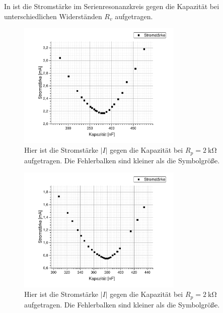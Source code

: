 \documentclass[
	a4paper,
	12pt,
	pagesize,
	ngerman
]{scrartcl}
\begin{document}
	In  ist die Stromstärke im Serienresonanzkreis gegen die Kapazität bei unterschiedlichen Widerständen $ R_v $ aufgetragen.
	\begin{figure}[H]
		\includegraphics[width=0.7\textwidth]{Parallelstromkreis_2k}
		\centering
		\caption{Hier ist die Stromstärke $ \left| I \right| $ gegen die Kapazität bei $ R_p = \SI{2}{\kilo \ohm} $ aufgetragen. Die Fehlerbalken sind kleiner als die Symbolgröße.}
		\label{Para_2k}
		\centering
	\end{figure} 
	\begin{figure}[H]
		\includegraphics[width=0.7\textwidth]{Parallelstromkreis_10k}
		\centering
		\caption{Hier ist die Stromstärke $ \left| I \right| $ gegen die Kapazität bei $ R_p = \SI{2}{\kilo \ohm} $ aufgetragen. Die Fehlerbalken sind kleiner als die Symbolgröße.}
		\label{Para_10k}
		\centering
	\end{figure} 
\end{document}
